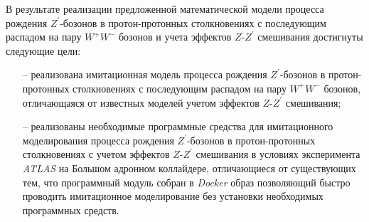 
В результате реализации предложенной математической модели процесса рождения ${Z}^{\prime}$-бозонов в протон-протонных столкновениях с последующим распадом на пару ${W}^{+}{W}^{-}$ бозонов и учета эффектов $Z$-${Z}^{\prime}$ смешивания достигнуты следующие цели: 
\begin{enumerate}
	\item[--] реализована имитационная модель процесса рождения ${Z}^{\prime}$-бозонов в протон-протонных столкновениях с последующим распадом на пару ${W}^{+}{W}^{-}$ бозонов, отличающаяся от известных моделей учетом эффектов $Z$-${Z}^{\prime}$ смешивания;
	\item[--] реализованы необходимые программные средства для имитационного моделирования процесса
	рождения ${Z}^{\prime}$-бозонов в протон-протонных столкновениях с учетом эффектов $Z$-${Z}^{\prime}$ смешивания в условиях эксперимента \textit{ATLAS} на Большом адронном коллайдере, отличающиеся от существующих тем, что программный модуль собран в \textit{Docker} образ позволяющий быстро проводить имитационное моделирование без установки необходимых программных средств.
\end{enumerate}
